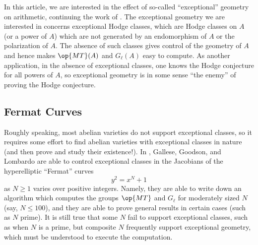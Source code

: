 \documentclass[openany]{book}
\begin{document}
In this article, we are interested in the effect of so-called ``exceptional'' geometry on arithmetic, continuing the work of \cite{ggl-fermat}.
The exceptional geometry we are interested in concerns exceptional Hodge classes, which are Hodge classes on $A$ (or a power of $A$) which are not generated by an endomorphism of $A$ or the polarization of $A$. The absence of such classes gives control of the geometry of $A$ and hence makes $\op{MT}(A)$ and $G_\ell(A)$ easy to compute. As another application, in the absence of exceptional classes, one knows the Hodge conjecture for all powers of $A$, so exceptional geometry is in some sense ``the enemy'' of proving the Hodge conjecture.

\subsection{Fermat Curves}
Roughly speaking, most abelian varieties do not support exceptional classes, so it requires some effort to find abelian varieties with exceptional classes in nature (and then prove and study their existence!). In \cite{ggl-fermat}, Gallese, Goodson, and Lombardo are able to control exceptional classes in the Jacobians of the hyperelliptic ``Fermat'' curves
\[y^2=x^N+1\]
as $N\ge1$ varies over positive integers. Namely, they are able to write down an algorithm which computes the groups $\op{MT}$ and $G_\ell$ for moderately sized $N$ (say, $N\le100$), and they are able to prove general results in certain cases (such as $N$ prime). It is still true that some $N$ fail to support exceptional classes, such as when $N$ is a prime, but composite $N$ frequently support exceptional geometry, which must be understood to execute the computation.
\end{document}
